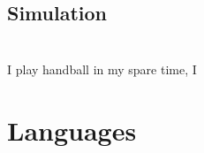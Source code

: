 \documentclass[]{infinity-cv}
\begin{document}
\subsection{Simulation}

\begin{minipage}{0.45\textwidth}
    
\end{minipage}
\hfill
\begin{minipage}{0.5\textwidth}
    
\end{minipage}

\section{\faGamepad}
I play handball in my spare time, I 

\section{Languages}
\end{document}

